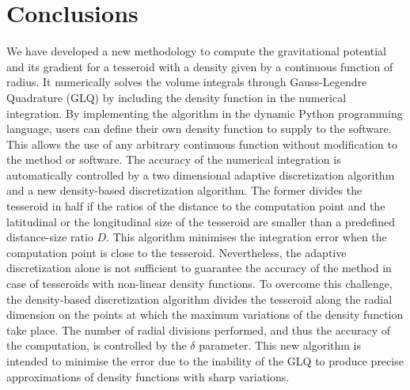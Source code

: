 
\section{Conclusions}

We have developed a new methodology to compute the gravitational potential and its
gradient for a tesseroid with a density given by a continuous function of radius.
It numerically solves the volume integrals through Gauss-Legendre Quadrature (GLQ) by
including the density function in the numerical integration.
By implementing the algorithm in the dynamic Python programming language, users can
define their own density function to supply to the software.
This allows the use of any arbitrary continuous function without modification to the
method or software.
The accuracy of the numerical integration is automatically controlled by a two
dimensional adaptive discretization algorithm and a new density-based discretization
algorithm.
The former divides the tesseroid in half if the ratios of the distance to the
computation point and the latitudinal or the longitudinal size of the tesseroid are
smaller than a predefined distance-size ratio $D$.
This algorithm minimises the integration error when the computation point is close to
the tesseroid.
Nevertheless, the adaptive discretization alone is not sufficient to guarantee the
accuracy of the method in case of tesseroids with non-linear density functions.
To overcome this challenge, the density-based discretization algorithm
divides the tesseroid along the radial dimension on the points at which the maximum
variations of the density function take place.
The number of radial divisions performed, and thus the accuracy of the computation, is
controlled by the $\delta$ parameter.
This new algorithm is intended to minimise the error due to the inability of
the GLQ to produce precise approximations of density functions with sharp variations.

